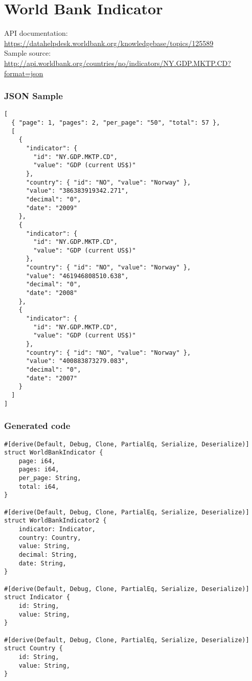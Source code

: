 \section{World Bank Indicator}
\label{app:worldbank}

API documentation: \url{https://datahelpdesk.worldbank.org/knowledgebase/topics/125589} \\
Sample source: \url{http://api.worldbank.org/countries/no/indicators/NY.GDP.MKTP.CD?format=json}

\begin{multicols}{2}

\subsubsection{JSON Sample}

\begin{verbatim}
[
  { "page": 1, "pages": 2, "per_page": "50", "total": 57 },
  [
    {
      "indicator": {
        "id": "NY.GDP.MKTP.CD",
        "value": "GDP (current US$)"
      },
      "country": { "id": "NO", "value": "Norway" },
      "value": "386383919342.271",
      "decimal": "0",
      "date": "2009"
    },
    {
      "indicator": {
        "id": "NY.GDP.MKTP.CD",
        "value": "GDP (current US$)"
      },
      "country": { "id": "NO", "value": "Norway" },
      "value": "461946808510.638",
      "decimal": "0",
      "date": "2008"
    },
    {
      "indicator": {
        "id": "NY.GDP.MKTP.CD",
        "value": "GDP (current US$)"
      },
      "country": { "id": "NO", "value": "Norway" },
      "value": "400883873279.083",
      "decimal": "0",
      "date": "2007"
    }
  ]
]
\end{verbatim}

\subsubsection{Generated code}

\begin{verbatim}
#[derive(Default, Debug, Clone, PartialEq, Serialize, Deserialize)]
struct WorldBankIndicator {
    page: i64,
    pages: i64,
    per_page: String,
    total: i64,
}

#[derive(Default, Debug, Clone, PartialEq, Serialize, Deserialize)]
struct WorldBankIndicator2 {
    indicator: Indicator,
    country: Country,
    value: String,
    decimal: String,
    date: String,
}

#[derive(Default, Debug, Clone, PartialEq, Serialize, Deserialize)]
struct Indicator {
    id: String,
    value: String,
}

#[derive(Default, Debug, Clone, PartialEq, Serialize, Deserialize)]
struct Country {
    id: String,
    value: String,
}
\end{verbatim}
\end{multicols}
